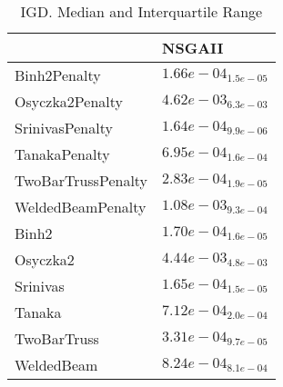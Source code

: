 \documentclass{article}
\begin{document}
\begin{table}
\caption{IGD. Median and Interquartile Range}
\label{table: IGD}
\centering
\begin{scriptsize}
\begin{tabular}{ll}
\hline &  NSGAII\\
\hline 
Binh2Penalty & \cellcolor{gray95}$  1.66e-04_{ 1.5e-05}$ \\
Osyczka2Penalty & \cellcolor{gray95}$  4.62e-03_{ 6.3e-03}$ \\
SrinivasPenalty & \cellcolor{gray95}$  1.64e-04_{ 9.9e-06}$ \\
TanakaPenalty & \cellcolor{gray95}$  6.95e-04_{ 1.6e-04}$ \\
TwoBarTrussPenalty & \cellcolor{gray95}$  2.83e-04_{ 1.9e-05}$ \\
WeldedBeamPenalty & \cellcolor{gray95}$  1.08e-03_{ 9.3e-04}$ \\
Binh2 & \cellcolor{gray95}$  1.70e-04_{ 1.6e-05}$ \\
Osyczka2 & \cellcolor{gray95}$  4.44e-03_{ 4.8e-03}$ \\
Srinivas & \cellcolor{gray95}$  1.65e-04_{ 1.5e-05}$ \\
Tanaka & \cellcolor{gray95}$  7.12e-04_{ 2.0e-04}$ \\
TwoBarTruss & \cellcolor{gray95}$  3.31e-04_{ 9.7e-05}$ \\
WeldedBeam & \cellcolor{gray95}$  8.24e-04_{ 8.1e-04}$ \\
\hline
\end{tabular}
\end{scriptsize}
\end{table}
\end{document}
